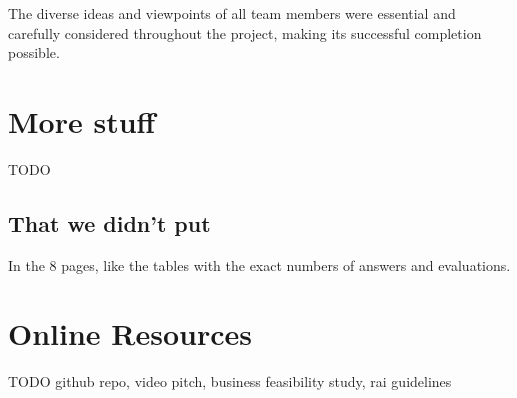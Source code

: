 \documentclass[sigconf, authorversion, nonacm, screen]{acmart}
\begin{document}
The diverse ideas and viewpoints of all team members were essential and carefully considered throughout the project, making its successful completion possible.

\section{More stuff}

TODO

\subsection{That we didn't put}

In the 8 pages, like the tables with the exact numbers of answers and evaluations.

\section{Online Resources}

TODO
github repo, video pitch, business feasibility study, rai guidelines
\end{document}
